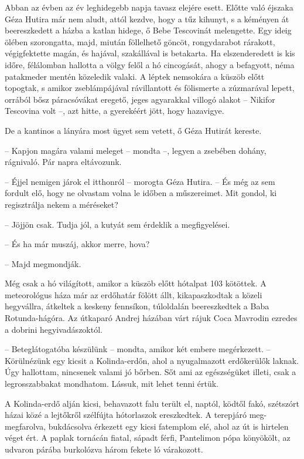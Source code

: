 \documentclass{IEEEtran}
\begin{document}
Abban az évben az év leghidegebb napja tavasz elejére esett. Előtte való
éjszaka Géza Hutira már nem aludt, attól kezdve, hogy a tűz kihunyt, s a
kéményen át beereszkedett a házba a katlan hidege, ő Bebe Tescovinát
melengette. Egy ideig ölében szorongatta, majd, miután föllelhető göncöt,
rongydarabot rárakott, végigfektette magán, és hajával, szakállával is
betakarta. Ha elszenderedett is kis időre, félálomban hallotta a völgy felől a
hó cincogását, ahogy a befagyott, néma patakmeder mentén közeledik valaki. A
léptek nemsokára a küszöb előtt topogtak, s amikor zseblámpájával rávillantott
és fölismerte a zúzmarával lepett, orrából bősz páracsóvákat eregető, jeges
agyarakkal villogó alakot – Nikifor Tescovina volt –, azt hitte, a gyerekéért
jött, hogy hazavigye.

De a kantinos a lányára most ügyet sem vetett, ő Géza Hutirát kereste.

– Kapjon magára valami meleget – mondta –, legyen a zsebében dohány,
rágnivaló. Pár napra eltávozunk.

– Éjjel nemigen járok el itthonról – morogta Géza Hutira. – És még az sem
fordult elő, hogy ne olvastam volna le időben a műszereimet. Mit gondol, ki
regisztrálja nekem a méréseket?

– Jöjjön csak. Tudja jól, a kutyát sem érdeklik a megfigyelései.

– És ha már muszáj, akkor merre, hova?

– Majd megmondják.

Még csak a hó világított, amikor a küszöb előtt hótalpat 103 kötöttek. A
meteorológus háza már az erdőhatár fölött állt, kikapaszkodtak a közeli
hegyvállra, átkeltek a keskeny fennsíkon, túloldalán beereszkedtek a Baba
Rotunda-hágóra. Az útkaparó Andrej házában várt rájuk Coca Mavrodin ezredes a
dobrini hegyivadászoktól.

– Beteglátogatóba készülünk – mondta, amikor két embere megérkezett. –
Körülnézünk egy kicsit a Kolinda-erdőn, ahol a nyugalmazott erdőkerülők
laknak. Úgy hallottam, nincsenek valami jó bőrben. Sőt ami az egészségüket
illeti, csak a legrosszabbakat mondhatom. Lássuk, mit lehet tenni értük.

A Kolinda-erdő alján kicsi, behavazott falu terült el, naptól, ködtől fakó,
szétszórt házai közé a lejtőkről szélfújta hótorlaszok ereszkedtek. A
terepjáró meg-megfarolva, bukdácsolva érkezett egy kicsi fatemplom elé, ahol
az út is hirtelen véget ért. A paplak tornácán fiatal, sápadt férfi,
Pantelimon pópa könyökölt, az udvaron párába burkolózva három fekete ló
várakozott.
\end{document}
